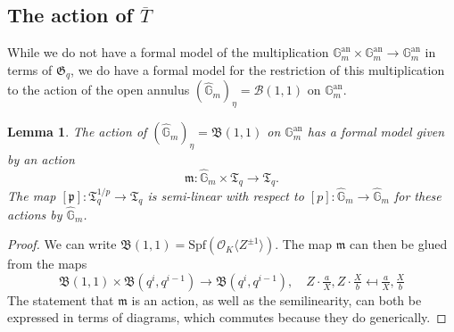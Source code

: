 \documentclass[10pt,oneside]{amsart}
\newtheorem{lemma}[theorem]{Lemma}
\theoremstyle{definition}
\begin{document}
		\subsection{The action of $\overline{T}$}
	While we do not have a formal model of the multiplication $\mathbb G_m^{\operatorname{an}}\times \mathbb G_m^{\operatorname{an}}\rightarrow \mathbb G_m^{\operatorname{an}}$ in terms of $\mathfrak G_q$, we do have a formal model for the restriction of this multiplication to the action of the open annulus $(\hat{\mathbb G}_m)_{\eta}=\mathcal B(1,1)$ on $\mathbb G_m^{\operatorname{an}}$.
	
	\begin{lemma}\label{action on formal model of torus}
		The action of $(\hat{\mathbb G}_m)_{\eta}=\mathfrak B(1,1)$ on $\mathbb G_m^{\mathrm{an}}$ has a formal model given by an action
		\[\mathfrak m:\hat{\mathbb G}_m\times \mathfrak T_q\rightarrow \mathfrak T_q.\]
		The map $[\mathfrak p]:\mathfrak T_q^{1/p}\rightarrow \mathfrak T_q$ is semi-linear with respect to $[p]:\hat{\mathbb G}_m\rightarrow \hat{\mathbb G}_m$ for these actions by $\hat{\mathbb G}_m$.
	\end{lemma} 
	\begin{proof}
		We can write $\mathfrak B(1,1)=\mathrm{Spf}(\mathcal O_K\langle Z^{\pm 1}\rangle)$.
		The map $\mathfrak m$ can then be glued from the maps
		\[\mathfrak B(1,1)\times \mathfrak B(q^i,q^{i-1})\to \mathfrak B(q^i,q^{i-1}),\quad Z\cdot \tfrac{a}{X},Z\cdot \tfrac{X}{b} \mapsfrom \tfrac{a}{X},\tfrac{X}{b} \]
		The statement that $\mathfrak m$ is an action, as well as the semilinearity, can both be expressed in terms of diagrams, which commutes because they do generically.
	\end{proof}
	


	
\end{document}
